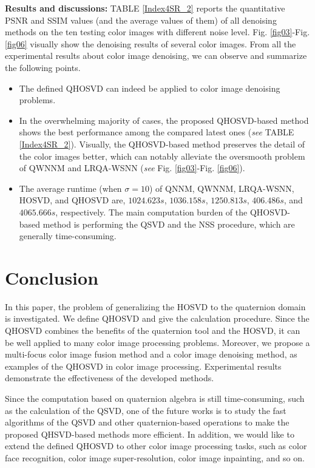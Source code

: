 \documentclass[journal]{IEEEtran}
\begin{document}
\textbf{Results and discussions:}
TABLE \ref{Index4SR_2} reports the quantitative PSNR and SSIM values (and the average values of them) of all denoising methods on the ten testing color images with different noise level. Fig. \ref{fig03}-Fig. \ref{fig06}  visually show the denoising results of several color images. From all the experimental results about color image denoising, we can observe
and summarize the following points.
\begin{itemize}
	\item The defined QHOSVD can indeed be applied to color image denoising problems.
	\item  In the overwhelming majority
	of cases, the proposed QHOSVD-based method shows the best performance among the compared latest ones (\emph{see} TABLE \ref{Index4SR_2}). Visually, the QHOSVD-based method preserves the detail of the color images better, which can notably alleviate the oversmooth problem of QWNNM and LRQA-WSNN (\emph{see} Fig. \ref{fig03}-Fig. \ref{fig06}).
	\item The average runtime (when $\sigma=10$) of QNNM, QWNNM, LRQA-WSNN, HOSVD, and QHOSVD are, $1024.623s$, $1036.158s$, $1250.813s$, $406.486s$, and $4065.666s$, respectively.
	The main computation burden of the QHOSVD-based method is performing the QSVD and the NSS procedure, which are generally time-consuming.
\end{itemize}



\section{Conclusion}
\label{sec:Conc}
In this paper, the problem of generalizing the HOSVD to the quaternion domain is investigated. We define QHOSVD and give the calculation procedure. Since the QHOSVD combines the benefits of the quaternion tool and the HOSVD, it can be well applied to many color image processing problems. Moreover, we propose a  multi-focus color image fusion method and a  color image denoising method, as examples of the QHOSVD in color image processing. Experimental results demonstrate the effectiveness of the developed methods.

Since the computation based on quaternion algebra is still time-consuming, such as the calculation of the QSVD, one of the future works is to study the fast algorithms of the QSVD and other quaternion-based operations to make the proposed QHSVD-based methods more efficient. In addition, we would like to extend the defined QHOSVD to other color image processing tasks, such as color face recognition, color image  super-resolution, color image inpainting, and so on.
\end{document}
